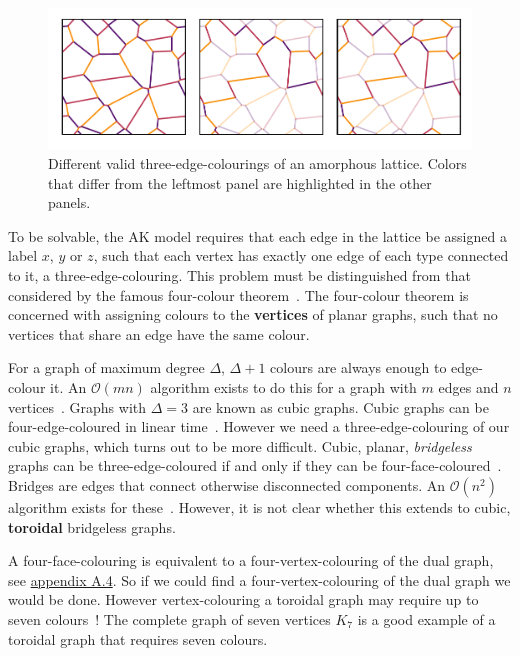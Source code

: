 \hypertarget{fig:multiple_colourings}{%
\begin{figure}
\centering
\includegraphics[width=1\textwidth,height=\textheight]{figure_code/amk_chapter/multiple_colourings/multiple_colourings}
\caption[{Colourings of an Amorphous Lattice}]{Different valid three-edge-colourings of an amorphous lattice. Colors that differ from the leftmost panel are highlighted in the other panels.}
\label{fig:multiple_colourings}
\end{figure}
}

To be solvable, the AK model requires that each edge in the lattice be assigned a label \(x\), \(y\) or \(z\), such that each vertex has exactly one edge of each type connected to it, a three-edge-colouring. This problem must be distinguished from that considered by the famous four-colour theorem~\autocite{appelEveryPlanarMap1989}. The four-colour theorem is concerned with assigning colours to the \textbf{vertices} of planar graphs, such that no vertices that share an edge have the same colour.

For a graph of maximum degree \(\Delta\), \(\Delta + 1\) colours are always enough to edge-colour it. An \(\mathcal{O}(mn)\) algorithm exists to do this for a graph with \(m\) edges and \(n\) vertices~\autocite{gEstimateChromaticClass1964}. Graphs with \(\Delta = 3\) are known as cubic graphs. Cubic graphs can be four-edge-coloured in linear time~\autocite{skulrattanakulchai4edgecoloringGraphsMaximum2002}. However we need a three-edge-colouring of our cubic graphs, which turns out to be more difficult. Cubic, planar, \emph{bridgeless} graphs can be three-edge-coloured if and only if they can be four-face-coloured~\autocite{tait1880remarks}. Bridges are edges that connect otherwise disconnected components. An \(\mathcal{O}(n^2)\) algorithm exists for these~\autocite{robertson1996efficiently}. However, it is not clear whether this extends to cubic, \textbf{toroidal} bridgeless graphs.

A four-face-colouring is equivalent to a four-vertex-colouring of the dual graph, see \protect\hyperlink{app-lattice-generation}{appendix A.4}. So if we could find a four-vertex-colouring of the dual graph we would be done. However vertex-colouring a toroidal graph may require up to seven colours~\autocite{heawoodMapColouringTheorems}! The complete graph of seven vertices \(K_7\) is a good example of a toroidal graph that requires seven colours.

